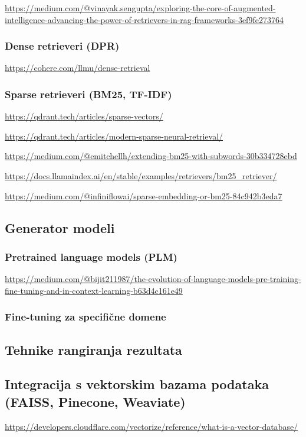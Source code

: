 \documentclass[]{foi}
\begin{document}
\url{https://medium.com/@vinayak.sengupta/exploring-the-core-of-augmented-intelligence-advancing-the-power-of-retrievers-in-rag-frameworks-3ef9fe273764}

\subsubsection{Dense retrieveri (DPR)}
\url{https://cohere.com/llmu/dense-retrieval}

\subsubsection{Sparse retrieveri (BM25, TF-IDF)}

\url{https://qdrant.tech/articles/sparse-vectors/}

\url{https://qdrant.tech/articles/modern-sparse-neural-retrieval/}

\url{https://medium.com/@emitchellh/extending-bm25-with-subwords-30b334728ebd}

\url{https://docs.llamaindex.ai/en/stable/examples/retrievers/bm25_retriever/}

\url{https://medium.com/@infiniflowai/sparse-embedding-or-bm25-84c942b3eda7}


\subsection{Generator modeli}
\subsubsection{Pretrained language models (PLM)}
\url{https://medium.com/@bijit211987/the-evolution-of-language-models-pre-training-fine-tuning-and-in-context-learning-b63d4c161e49}

\subsubsection{Fine-tuning za specifične domene}
\subsection{Tehnike rangiranja rezultata}
\subsection{Integracija s vektorskim bazama podataka (FAISS, Pinecone, Weaviate)}

\url{https://developers.cloudflare.com/vectorize/reference/what-is-a-vector-database/}
\end{document}
